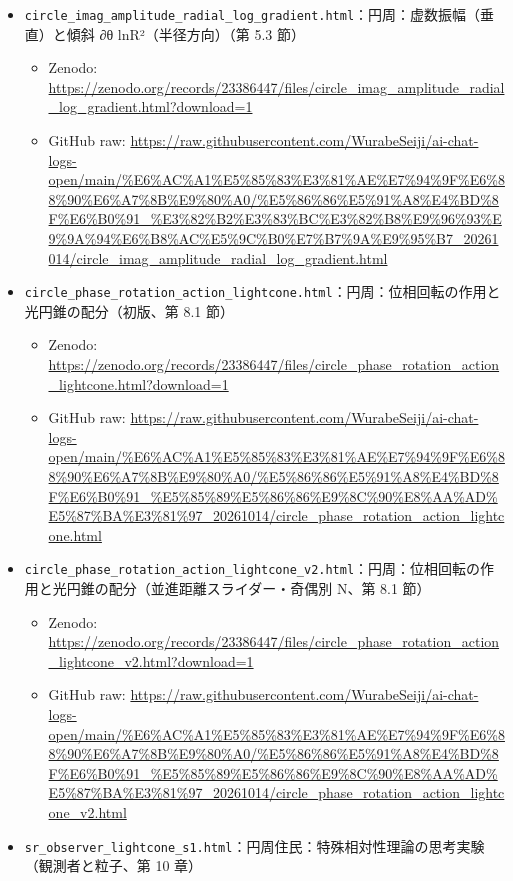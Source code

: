 \documentclass[
  a4paper,
]{ltjsarticle}
\providecommand{\tightlist}{%
  \setlength{\itemsep}{0pt}\setlength{\parskip}{0pt}}
\begin{document}
\begin{itemize}
\tightlist
\item
  \texttt{circle\_\allowbreak{}imag\_\allowbreak{}amplitude\_\allowbreak{}radial\_\allowbreak{}log\_\allowbreak{}gradient.html}：円周：虚数振幅（垂直）と傾斜
  ∂θ ln\textbar R²\textbar（半径方向）（第 5.3 節）

  \begin{itemize}
  \tightlist
  \item
    Zenodo:
    \url{https://zenodo.org/records/23386447/files/circle_imag_amplitude_radial_log_gradient.html?download=1}
  \item
    GitHub raw:
    \url{https://raw.githubusercontent.com/WurabeSeiji/ai-chat-logs-open/main/\%E6\%AC\%A1\%E5\%85\%83\%E3\%81\%AE\%E7\%94\%9F\%E6\%88\%90\%E6\%A7\%8B\%E9\%80\%A0/\%E5\%86\%86\%E5\%91\%A8\%E4\%BD\%8F\%E6\%B0\%91_\%E3\%82\%B2\%E3\%83\%BC\%E3\%82\%B8\%E9\%96\%93\%E9\%9A\%94\%E6\%B8\%AC\%E5\%9C\%B0\%E7\%B7\%9A\%E9\%95\%B7_20261014/circle_imag_amplitude_radial_log_gradient.html}
  \end{itemize}
\item
  \texttt{circle\_\allowbreak{}phase\_\allowbreak{}rotation\_\allowbreak{}action\_\allowbreak{}lightcone.html}：円周：位相回転の作用と光円錐の配分（初版、第
  8.1 節）

  \begin{itemize}
  \tightlist
  \item
    Zenodo:
    \url{https://zenodo.org/records/23386447/files/circle_phase_rotation_action_lightcone.html?download=1}
  \item
    GitHub raw:
    \url{https://raw.githubusercontent.com/WurabeSeiji/ai-chat-logs-open/main/\%E6\%AC\%A1\%E5\%85\%83\%E3\%81\%AE\%E7\%94\%9F\%E6\%88\%90\%E6\%A7\%8B\%E9\%80\%A0/\%E5\%86\%86\%E5\%91\%A8\%E4\%BD\%8F\%E6\%B0\%91_\%E5\%85\%89\%E5\%86\%86\%E9\%8C\%90\%E8\%AA\%AD\%E5\%87\%BA\%E3\%81\%97_20261014/circle_phase_rotation_action_lightcone.html}
  \end{itemize}
\item
  \texttt{circle\_\allowbreak{}phase\_\allowbreak{}rotation\_\allowbreak{}action\_\allowbreak{}lightcone\_\allowbreak{}v2.html}：円周：位相回転の作用と光円錐の配分（並進距離スライダー・奇偶別
  N、第 8.1 節）

  \begin{itemize}
  \tightlist
  \item
    Zenodo:
    \url{https://zenodo.org/records/23386447/files/circle_phase_rotation_action_lightcone_v2.html?download=1}
  \item
    GitHub raw:
    \url{https://raw.githubusercontent.com/WurabeSeiji/ai-chat-logs-open/main/\%E6\%AC\%A1\%E5\%85\%83\%E3\%81\%AE\%E7\%94\%9F\%E6\%88\%90\%E6\%A7\%8B\%E9\%80\%A0/\%E5\%86\%86\%E5\%91\%A8\%E4\%BD\%8F\%E6\%B0\%91_\%E5\%85\%89\%E5\%86\%86\%E9\%8C\%90\%E8\%AA\%AD\%E5\%87\%BA\%E3\%81\%97_20261014/circle_phase_rotation_action_lightcone_v2.html}
  \end{itemize}
\item
  \texttt{sr\_\allowbreak{}observer\_\allowbreak{}lightcone\_\allowbreak{}s1.html}：円周住民：特殊相対性理論の思考実験（観測者と粒子、第
  10 章）


\end{itemize}
\end{document}
